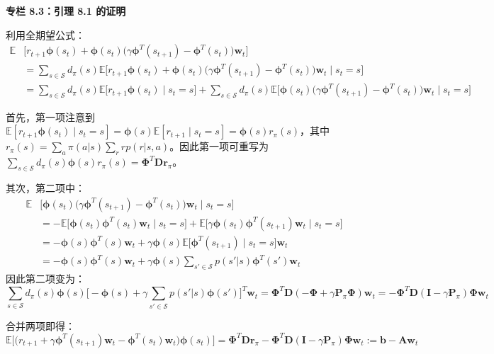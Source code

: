 \documentclass[UTF8]{article}
\begin{document}
\begin{proofbox}
\textbf{专栏 8.3：引理 8.1 的证明}

利用全期望公式：
\[
\begin{aligned}
\mathbb{E}&\big[r_{t+1}\boldsymbol{\phi}(s_t) + \boldsymbol{\phi}(s_t)\big(\gamma\boldsymbol{\phi}^T(s_{t+1}) - \boldsymbol{\phi}^T(s_t)\big)\boldsymbol{w}_t\big] \\
&= \sum_{s \in \mathcal{S}} d_\pi(s) \mathbb{E}\Big[r_{t+1}\boldsymbol{\phi}(s_t) + \boldsymbol{\phi}(s_t)\big(\gamma\boldsymbol{\phi}^T(s_{t+1}) - \boldsymbol{\phi}^T(s_t)\big)\boldsymbol{w}_t \;\Big|\; s_t = s\Big] \\
&= \sum_{s \in \mathcal{S}} d_\pi(s) \mathbb{E}\big[r_{t+1}\boldsymbol{\phi}(s_t) \mid s_t = s\big] + \sum_{s \in \mathcal{S}} d_\pi(s) \mathbb{E}\Big[\boldsymbol{\phi}(s_t)\big(\gamma\boldsymbol{\phi}^T(s_{t+1}) - \boldsymbol{\phi}^T(s_t)\big)\boldsymbol{w}_t \;\Big|\; s_t = s\Big]
\end{aligned}
\]

首先，第一项注意到 $\mathbb{E}[r_{t+1}\boldsymbol{\phi}(s_t) \mid s_t = s] = \boldsymbol{\phi}(s)\mathbb{E}[r_{t+1} \mid s_t = s] = \boldsymbol{\phi}(s) r_\pi(s)$，其中 $r_\pi(s) = \sum_a \pi(a|s) \sum_r r p(r|s,a)$。因此第一项可重写为 $\sum_{s \in \mathcal{S}} d_\pi(s)\boldsymbol{\phi}(s)r_\pi(s) = \boldsymbol{\Phi}^T\boldsymbol{D}\boldsymbol{r}_\pi$。

其次，第二项中：
\[
\begin{aligned}
\mathbb{E}&\Big[\boldsymbol{\phi}(s_t)\big(\gamma\boldsymbol{\phi}^T(s_{t+1}) - \boldsymbol{\phi}^T(s_t)\big)\boldsymbol{w}_t \;\Big|\; s_t = s\Big] \\
&= -\mathbb{E}\big[\boldsymbol{\phi}(s_t)\boldsymbol{\phi}^T(s_t)\boldsymbol{w}_t \mid s_t = s\big] + \mathbb{E}\big[\gamma\boldsymbol{\phi}(s_t)\boldsymbol{\phi}^T(s_{t+1})\boldsymbol{w}_t \mid s_t = s\big] \\
&= -\boldsymbol{\phi}(s)\boldsymbol{\phi}^T(s)\boldsymbol{w}_t + \gamma\boldsymbol{\phi}(s) \mathbb{E}\big[\boldsymbol{\phi}^T(s_{t+1}) \mid s_t = s\big] \boldsymbol{w}_t \\
&= -\boldsymbol{\phi}(s)\boldsymbol{\phi}^T(s)\boldsymbol{w}_t + \gamma\boldsymbol{\phi}(s) \sum_{s' \in \mathcal{S}} p(s'|s)\boldsymbol{\phi}^T(s')\boldsymbol{w}_t
\end{aligned}
\]
因此第二项变为：
\[
\sum_{s \in \mathcal{S}} d_\pi(s) \boldsymbol{\phi}(s) \Big[-\boldsymbol{\phi}(s) + \gamma\sum_{s' \in \mathcal{S}} p(s'|s)\boldsymbol{\phi}(s')\Big]^T \boldsymbol{w}_t
= \boldsymbol{\Phi}^T\boldsymbol{D}(-\boldsymbol{\Phi} + \gamma\boldsymbol{P}_\pi\boldsymbol{\Phi})\boldsymbol{w}_t
= -\boldsymbol{\Phi}^T\boldsymbol{D}(\boldsymbol{I} - \gamma\boldsymbol{P}_\pi)\boldsymbol{\Phi}\boldsymbol{w}_t
\]

合并两项即得：
\[
\mathbb{E}\Big[\big(r_{t+1} + \gamma\boldsymbol{\phi}^T(s_{t+1})\boldsymbol{w}_t - \boldsymbol{\phi}^T(s_t)\boldsymbol{w}_t\big)\boldsymbol{\phi}(s_t)\Big]
= \boldsymbol{\Phi}^T\boldsymbol{D}\boldsymbol{r}_\pi - \boldsymbol{\Phi}^T\boldsymbol{D}(\boldsymbol{I} - \gamma\boldsymbol{P}_\pi)\boldsymbol{\Phi}\boldsymbol{w}_t
:= \boldsymbol{b} - \boldsymbol{A}\boldsymbol{w}_t
\]
\end{proofbox}
\end{document}
